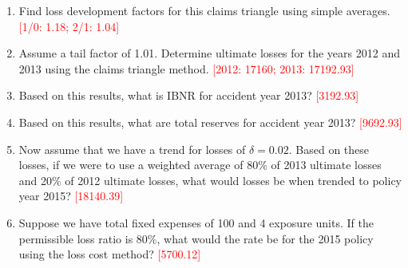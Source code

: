 \documentclass{article}
\begin{document}
\begin{enumerate}
\item Find loss development factors for this claims triangle using simple averages. \textcolor{red}{[1/0:  1.18; 2/1: 1.04]}

\item Assume a tail factor of 1.01. Determine ultimate losses for the years 2012 and 2013 using the claims triangle method. \textcolor{red}{[2012: 17160; 2013: 17192.93]}

\item Based on this results, what is IBNR for accident year 2013? \textcolor{red}{[3192.93]}

\item Based on this results, what are total reserves for accident year 2013? \textcolor{red}{[9692.93]}


\item Now assume that we have a trend for losses of $\delta = 0.02$. Based on these losses, if we were to use a weighted average of 80\% of 2013 ultimate losses and 20\% of 2012 ultimate losses, what would losses be when trended to policy year 2015?  \textcolor{red}{[18140.39]}

\item Suppose we have total fixed expenses of 100 and 4 exposure units. If the permissible loss ratio is 80\%, what would the rate be for the 2015 policy using the loss cost method? \textcolor{red}{[5700.12]}

\end{enumerate}
\end{document}
